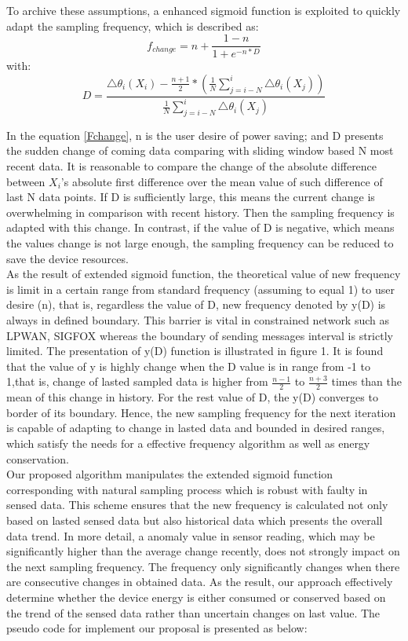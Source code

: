 To archive these assumptions, a enhanced sigmoid function is exploited to quickly adapt the sampling frequency, which is described as: 
\begin{equation}\label{Fchange}
 f_{change} = n + \frac{1-n}{1 + e^{-n*D}}
\end{equation}
with:
\begin{equation}\label{D}
 D = \frac{\triangle\theta_i(X_i) - \frac{n+1}{2}*(\frac{1}{N}\sum_{j=i-N}^{i} \triangle\theta_i(X_j))}{\frac{1}{N}\sum_{j=i-N}^{i} \triangle\theta_i(X_j)}
\end{equation}

In the equation \ref{Fchange}, n is the user desire of power saving; and D presents the sudden change of coming data comparing with sliding window based N most recent data. It is reasonable to compare the change of 
the absolute difference between $ X_i $'s absolute first difference over the mean value of such difference of last N data points. If D is sufficiently large, this means the current change is overwhelming in comparison with recent history. Then the sampling frequency is adapted with this change. In contrast, if the value of D is negative, which means the values change is not large enough, the sampling frequency can be reduced to save the device resources. \\

As the result of extended sigmoid function, the theoretical value of new frequency is limit in a certain range from standard frequency (assuming to equal 1) to user desire (n), that is, regardless the value of D, new frequency denoted by y(D) is always in defined boundary. This barrier is vital in constrained network such as LPWAN, SIGFOX whereas the boundary of sending messages interval is strictly limited. The presentation of y(D) function is illustrated in figure 1. It is found that the value of y is highly change when the D value is in range from -1 to 1,that is, change of lasted sampled data is higher from $ \frac{n-1}{2} $ to $ \frac{n+3}{2} $ times than the mean of this change in history. For the rest value of D, the y(D) converges to border of its boundary. Hence, the new sampling frequency for the next iteration is capable of adapting to change in lasted data and bounded in desired ranges, which satisfy the needs for a effective frequency algorithm as well as energy conservation. \\

Our proposed algorithm manipulates the extended sigmoid function corresponding with natural sampling process which is robust with faulty in sensed data. This scheme ensures that the new frequency is calculated not only based on lasted sensed data but also historical data which presents the overall data trend. In more detail, a anomaly value in sensor reading, which may be significantly higher than the average change recently, does not strongly impact on the next sampling frequency. The frequency only significantly changes when there are consecutive changes in obtained data. As the result, our approach effectively determine whether the device energy is either consumed or conserved based on the trend of the sensed data rather than uncertain changes on last value. 
The pseudo code for implement our proposal is presented as below:


